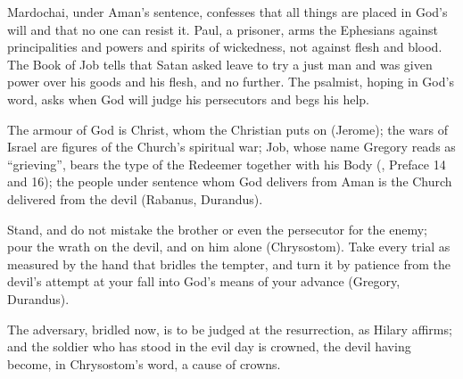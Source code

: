 \begin{fourSenses}
\item[Literal.] Mardochai, under Aman's sentence, confesses that all things are
placed in God's will and that no one can resist it. Paul, a prisoner, arms the
Ephesians against principalities and powers and spirits of wickedness, not
against flesh and blood. The Book of Job tells that Satan asked leave to try a
just man and was given power over his goods and his flesh, and no further. The
psalmist, hoping in God's word, asks when God will judge his persecutors and begs
his help.
\item[Allegorical.] The armour of God is Christ, whom the Christian puts on
(Jerome); the wars of Israel are figures of the Church's spiritual war; Job,
whose name Gregory reads as ``grieving'', bears the type of the Redeemer together
with his Body (, Preface 14 and 16); the people under sentence
whom God delivers from Aman is the Church delivered from the devil (Rabanus,
Durandus).
\item[Moral.] Stand, and do not mistake the brother or even the persecutor for
the enemy; pour the wrath on the devil, and on him alone (Chrysostom). Take every
trial as measured by the hand that bridles the tempter, and turn it by patience
from the devil's attempt at your fall into God's means of your advance (Gregory,
Durandus).
\item[Anagogical.] The adversary, bridled now, is to be judged at the
resurrection, as Hilary affirms; and the soldier who has stood in the evil day
is crowned, the devil having become, in Chrysostom's word, a cause of crowns.
\end{fourSenses}
